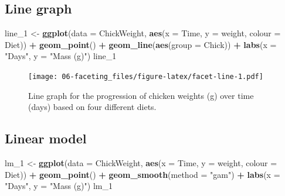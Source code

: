 \documentclass[
]{book}
\newenvironment{Shaded}{\begin{snugshade}}{\end{snugshade}}
\newcommand{\DataTypeTok}[1]{\textcolor[rgb]{0.13,0.29,0.53}{#1}}
\newcommand{\DecValTok}[1]{\textcolor[rgb]{0.00,0.00,0.81}{#1}}
\newcommand{\KeywordTok}[1]{\textcolor[rgb]{0.13,0.29,0.53}{\textbf{#1}}}
\newcommand{\NormalTok}[1]{#1}
\newcommand{\OperatorTok}[1]{\textcolor[rgb]{0.81,0.36,0.00}{\textbf{#1}}}
\newcommand{\StringTok}[1]{\textcolor[rgb]{0.31,0.60,0.02}{#1}}
\begin{document}
\hypertarget{line-graph}{%
\subsection{Line graph}\label{line-graph}}

\begin{Shaded}
\begin{Highlighting}[]
\NormalTok{line\_}\DecValTok{1}\NormalTok{ <{-}}\StringTok{ }\KeywordTok{ggplot}\NormalTok{(}\DataTypeTok{data =}\NormalTok{ ChickWeight, }\KeywordTok{aes}\NormalTok{(}\DataTypeTok{x =}\NormalTok{ Time, }\DataTypeTok{y =}\NormalTok{ weight, }\DataTypeTok{colour =}\NormalTok{ Diet)) }\OperatorTok{+}
\StringTok{  }\KeywordTok{geom\_point}\NormalTok{() }\OperatorTok{+}
\StringTok{  }\KeywordTok{geom\_line}\NormalTok{(}\KeywordTok{aes}\NormalTok{(}\DataTypeTok{group =}\NormalTok{ Chick)) }\OperatorTok{+}
\StringTok{  }\KeywordTok{labs}\NormalTok{(}\DataTypeTok{x =} \StringTok{"Days"}\NormalTok{, }\DataTypeTok{y =} \StringTok{"Mass (g)"}\NormalTok{)}
\NormalTok{line\_}\DecValTok{1}
\end{Highlighting}
\end{Shaded}

\begin{figure}
\centering
\texttt{[image: 06-faceting\_files/figure-latex/facet-line-1.pdf]}
\caption{\label{fig:facet-line}Line graph for the progression of chicken weights (g) over time (days) based on four different diets.}
\end{figure}

\hypertarget{linear-model}{%
\subsection{Linear model}\label{linear-model}}

\begin{Shaded}
\begin{Highlighting}[]
\NormalTok{lm\_}\DecValTok{1}\NormalTok{ <{-}}\StringTok{ }\KeywordTok{ggplot}\NormalTok{(}\DataTypeTok{data =}\NormalTok{ ChickWeight, }\KeywordTok{aes}\NormalTok{(}\DataTypeTok{x =}\NormalTok{ Time, }\DataTypeTok{y =}\NormalTok{ weight, }\DataTypeTok{colour =}\NormalTok{ Diet)) }\OperatorTok{+}
\StringTok{  }\KeywordTok{geom\_point}\NormalTok{() }\OperatorTok{+}
\StringTok{  }\KeywordTok{geom\_smooth}\NormalTok{(}\DataTypeTok{method =} \StringTok{"gam"}\NormalTok{) }\OperatorTok{+}
\StringTok{  }\KeywordTok{labs}\NormalTok{(}\DataTypeTok{x =} \StringTok{"Days"}\NormalTok{, }\DataTypeTok{y =} \StringTok{"Mass (g)"}\NormalTok{)}
\NormalTok{lm\_}\DecValTok{1}
\end{Highlighting}
\end{Shaded}
\end{document}
